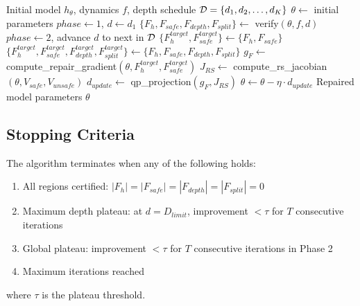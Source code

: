 \begin{algorithm}[t]
    \caption{Progressive Depth Phased Repair}
    \label{alg:progressive_repair}
    \begin{algorithmic}
        \REQUIRE Initial model $h_\theta$, dynamics $f$, depth schedule $\mathcal{D} = \{d_1, d_2, \ldots, d_K\}$
        \STATE $\theta \leftarrow$ initial parameters
        \STATE $phase \leftarrow 1$, $d \leftarrow d_1$
        \STATE $\{F_h, F_{safe}, F_{depth}, F_{split}\} \leftarrow$ verify$(\theta, f, d)$
        \STATE $phase \leftarrow 2$, advance $d$ to next in $\mathcal{D}$
        \ENDIF
        \STATE $\{F_h^{target}, F_{safe}^{target}\} \leftarrow \{F_h, F_{safe}\}$
        \ELSE
        \STATE $\{F_h^{target}, F_{safe}^{target}, F_{depth}^{target}, F_{split}^{target}\} \leftarrow \{F_h, F_{safe}, F_{depth}, F_{split}\}$
        \ENDIF
        \STATE $g_F \leftarrow$ compute\_repair\_gradient$(\theta, F_h^{target}, F_{safe}^{target})$
        \STATE $J_{RS} \leftarrow$ compute\_rs\_jacobian$(\theta, V_{safe}, V_{unsafe})$
        \STATE $d_{update} \leftarrow$ qp\_projection$(g_F, J_{RS})$
        \STATE $\theta \leftarrow \theta - \eta \cdot d_{update}$
        \ENDWHILE
        \RETURN Repaired model parameters $\theta$
    \end{algorithmic}
\end{algorithm}

\subsection{Stopping Criteria}

\begin{condition}
    The algorithm terminates when any of the following holds:
    \begin{enumerate}
        \item All regions certified: $|F_h| = |F_{safe}| = |F_{depth}| = |F_{split}| = 0$
        \item Maximum depth plateau: at $d = D_{limit}$, improvement $< \tau$ for $T$ consecutive iterations
        \item Global plateau: improvement $< \tau$ for $T$ consecutive iterations in Phase 2
        \item Maximum iterations reached
    \end{enumerate}
    where $\tau$ is the plateau threshold.
\end{condition}

